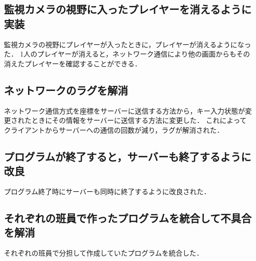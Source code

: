 \documentclass{jarticle}
\begin{document}
\subsection{監視カメラの視野に入ったプレイヤーを消えるように実装}
監視カメラの視野にプレイヤーが入ったときに，プレイヤーが消えるようになった．
1人のプレイヤーが消えると，ネットワーク通信により他の画面からもその消えたプレイヤーを確認することができる．

\subsection{ネットワークのラグを解消}
ネットワーク通信方式を座標をサーバーに送信する方法から，キー入力状態が変更されたときにその情報をサーバーに送信する方法に変更した．
これによってクライアントからサーバーへの通信の回数が減り，ラグが解消された．

\subsection{プログラムが終了すると，サーバーも終了するように改良}
プログラム終了時にサーバーも同時に終了するように改良された．

\subsection{それぞれの班員で作ったプログラムを統合して不具合を解消}
それぞれの班員で分担して作成していたプログラムを統合した．
\end{document}
